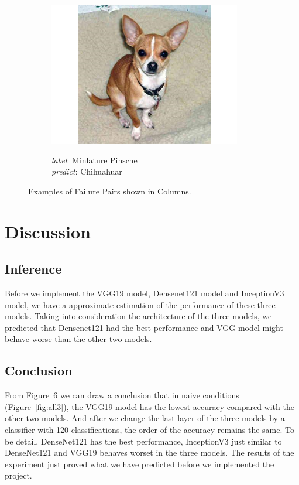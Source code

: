 \documentclass{article}
\begin{document}
\begin{figure}[h]
\begin{subfigure}{0.32\linewidth}
		\includegraphics[width=\linewidth]{pics/s2}
		\caption{}
		\emph{label}:  Minlature Pinsche \\  \emph{predict}: Chihuahuar
		\label{fig:s2}
	\end{subfigure} 
	
	\caption{Examples of Failure Pairs shown in Columns.}
\end{figure}
 

\newpage
\section{Discussion}
\subsection{Inference}
Before we implement the VGG19 model, Densenet121 model and InceptionV3 model, we have a approximate estimation of the performance of these three models. Taking into consideration the architecture of the three models, we predicted that Densenet121 had the best performance and VGG model might behave worse than the other two models. 
\subsection{Conclusion}
From Figure~6 we can draw a conclusion that in naive conditions (Figure~\ref{fig:all3}), the VGG19 model has the lowest accuracy compared with the other two models. And after we change the last layer of the three models by a classifier with 120 classifications, the order of the accuracy remains the same. To be detail, DenseNet121 has the best performance, InceptionV3 just similar to DenseNet121 and VGG19 behaves worset in the three models. The results of the experiment just proved what we have predicted before we implemented the project.
\end{document}
